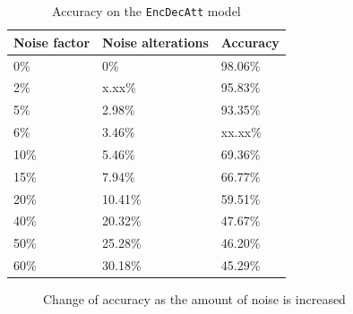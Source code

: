 \begin{table}[H]
    \centering
    \begin{tabular}{|l|l|l|}
        \hline 
        \textbf{Noise factor}          & \textbf{Noise alterations}       & \textbf{Accuracy}         \\ \hline
        0\%                            & 0\%                              & 98.06\%                   \\ \hline
        2\%                            & x.xx\%                           & 95.83\%                   \\ \hline
        5\%                            & 2.98\%                           & 93.35\%                   \\ \hline
        6\%                            & 3.46\%                           & xx.xx\%                   \\ \hline
        10\%                           & 5.46\%                           & 69.36\%                   \\ \hline
        15\%                           & 7.94\%                           & 66.77\%                   \\ \hline
        20\%                           & 10.41\%                          & 59.51\%                   \\ \hline
        40\%                           & 20.32\%                          & 47.67\%                   \\ \hline
        50\%                           & 25.28\%                          & 46.20\%                   \\ \hline
        60\%                           & 30.18\%                          & 45.29\%                   \\ \hline
    \end{tabular}
    \caption{Accuracy on the {\tt EncDecAtt} model}
    \label{table:noise_accuracy}
\end{table}

\begin{figure}[H]
    \centering
    \captionsetup{justification=centering}
    \caption{Change of accuracy as the amount of noise is increased}
    \label{fig:noise_accuracy}
\end{figure}

